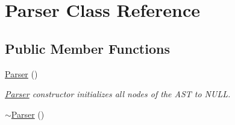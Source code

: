 \hypertarget{classParser}{\section{Parser Class Reference}
\label{classParser}
}
\subsection*{Public Member Functions}
\begin{DoxyCompactItemize}
\item 
\hypertarget{classParser_a12234f6cd36b61af4b50c94a179422c1}{\hyperlink{classParser_a12234f6cd36b61af4b50c94a179422c1}{Parser} ()}\label{classParser_a12234f6cd36b61af4b50c94a179422c1}

\begin{DoxyCompactList}\small\item\em \hyperlink{classParser}{Parser} constructor initializes all nodes of the A\-S\-T to N\-U\-L\-L. \end{DoxyCompactList}\item 
\hypertarget{classParser_a3e658b5917a93a3ef648050d060e3a93}{\hyperlink{classParser_a3e658b5917a93a3ef648050d060e3a93}{$\sim$\-Parser} ()}\label{classParser_a3e658b5917a93a3ef648050d060e3a93}


\end{DoxyCompactItemize}
